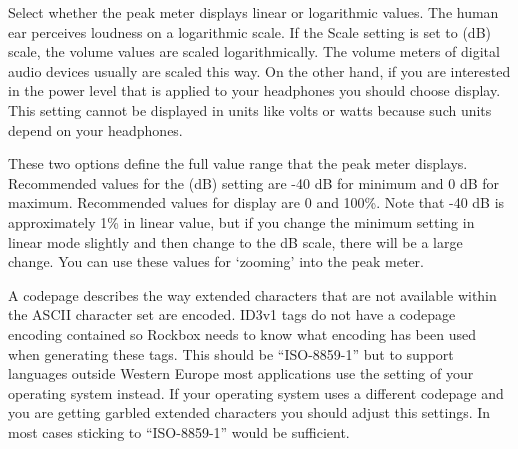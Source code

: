 \begin{description}
{\begin{description}
        Select whether the peak meter displays linear or logarithmic values.
        The human ear perceives loudness on a logarithmic scale. If the Scale
        setting is set to  (dB) scale, the volume values
        are scaled logarithmically. The volume meters of digital audio
        devices usually are scaled this way. On the other hand, if you
        are interested in the power level that is applied to your headphones
        you should choose  display. This setting cannot be
        displayed in units like volts or watts because such units depend
        on your headphones.
      \item[Minimum and maximum range:]
        These two options define the full value range that the peak meter
        displays. Recommended values for the  (dB) setting
        are {}-40 dB for minimum and 0 dB for maximum. Recommended values
        for  display are 0 and 100\%. Note that {}-40 dB is
        approximately 1\% in linear value, but if you change the minimum
        setting in linear mode slightly and then change to the dB scale,
        there will be a large change. You can use these values for `zooming'
        into the peak meter.
      \end{description}
    }
    \item[\label{ref:Defaultcodepage}Default Codepage:]
      A codepage describes the way extended characters that are not available
      within the ASCII character set are encoded. ID3v1 tags do not have a
      codepage encoding contained so Rockbox needs to know what encoding has
      been used when generating these tags. This should be ``ISO-8859-1'' but
      to support languages outside Western Europe most applications use
      the setting of your operating system instead. If your operating system
      uses a different codepage and you are getting garbled extended characters
      you should adjust this settings. In most cases sticking to
      ``ISO-8859-1'' would be sufficient.
  \end{description}

